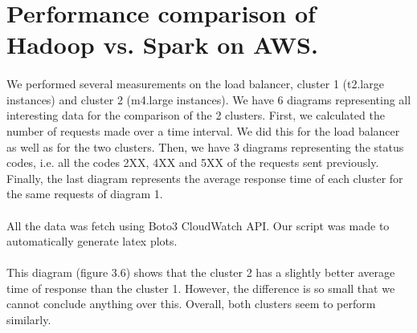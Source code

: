 \pagebreak
\section{Performance comparison of Hadoop vs. Spark on AWS.} \label{T3}
\paragraph{} We performed several measurements on the load balancer, cluster 1 (t2.large instances) and cluster 2 (m4.large instances). We have 6 diagrams representing all interesting data for the comparison of the 2 clusters. First, we calculated the number of requests made over a time interval. We did this for the load balancer as well as for the two clusters. Then, we have 3 diagrams representing the status codes, i.e. all the codes 2XX, 4XX and 5XX of the requests sent previously. Finally, the last diagram represents the average response time of each cluster for the same requests of diagram 1.

\paragraph{} All the data was fetch using Boto3 CloudWatch API. Our script was made to automatically generate latex plots.
\paragraph{} This diagram (figure 3.6) shows that the cluster 2 has a slightly better average time of response than the cluster 1. However, the difference is so small that we cannot conclude anything over this. Overall, both clusters seem to perform similarly.